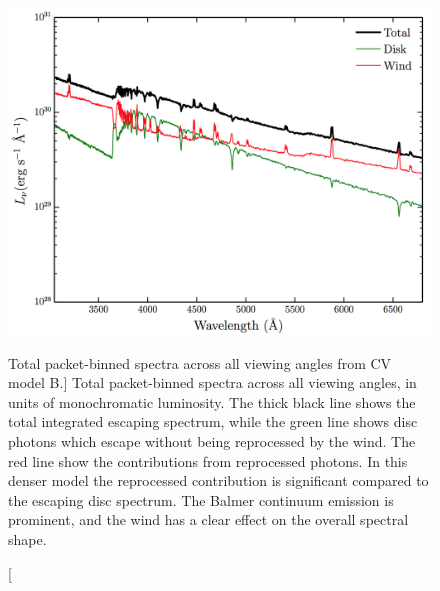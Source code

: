 \begin{figure} 
\centering
\includegraphics[width=1.0\textwidth]{figures/05-cvpaper/modelb_escaping.png}
\caption
[Total packet-binned spectra across all viewing angles from CV model B.]
{Total packet-binned spectra across all viewing angles, in units
of monochromatic luminosity. 
The thick black line shows the total 
integrated escaping spectrum, 
while the green line shows disc photons which escape without being reprocessed by
the wind. The red line show the contributions from reprocessed 
photons. 
In this denser model the reprocessed contribution is significant compared
to the escaping disc spectrum. The Balmer continuum emission is prominent, and
the wind has a clear effect on the overall spectral shape.}
\label{modelb_escape}
\end{figure} 

